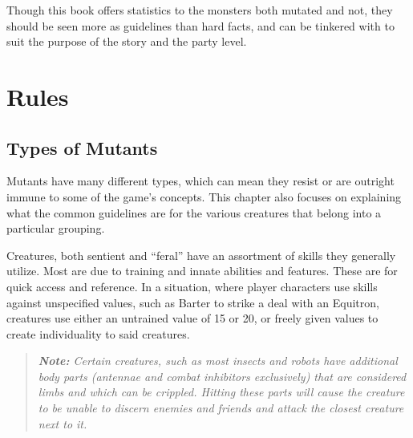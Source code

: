 \documentclass[11pt,a4paper,twocolumn]{book}
\begin{document}
	Though this book offers statistics to the monsters both mutated and not, they should be seen more as guidelines than hard facts, and can be tinkered with to suit the purpose of the story and the party level.
	
	\clearpage
	
	\chapter{Rules}
	
	\section*{Types of Mutants}
	Mutants have many different types, which can mean they resist or are outright immune to some of the game's concepts. This chapter also focuses on explaining what the common guidelines are for the various creatures that belong into a particular grouping.
	
	Creatures, both sentient and ``feral'' have an assortment of skills they generally utilize. Most are due to training and innate abilities and features. These are for quick access and reference. In a situation, where player characters use skills against unspecified values, such as Barter to strike a deal with an Equitron, creatures use either an untrained value of 15 or 20, or freely given values to create individuality to said creatures.
	
	\begin{verse}
		\emph{\textbf{Note:} Certain creatures, such as most insects and robots have additional body parts (antennae and combat inhibitors exclusively) that are considered limbs and which can be crippled. Hitting these parts will cause the creature to be unable to discern enemies and friends and attack the closest creature next to it.}
	\end{verse}
	
\end{document}
